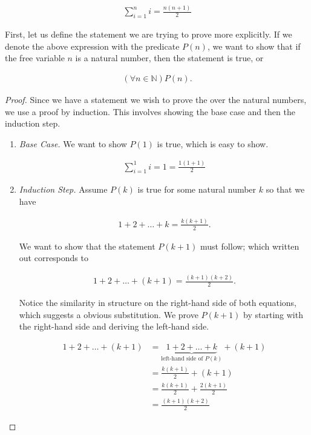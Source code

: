 \documentclass[twoside]{report}
\begin{document}
\begin{align*}
	\sum_{i = 1}^{n} i = \frac{n(n + 1)}{2}
\end{align*}

First, let us define the statement we are trying to prove more explicitly. If we denote the above expression with the predicate $P(n)$, we want to show that if the free variable $n$ is a natural number, then the statement is true, or

\begin{align*}
	(\forall n \in \mathbb{N})P(n).
\end{align*}

\vspace{\baselineskip}
\begin{proof}
	Since we have a statement we wish to prove the over the natural numbers, we use a proof by induction. This involves showing the base case and then the induction step.
	
	\vspace{\baselineskip}
	\begin{enumerate}
		\item \emph{Base Case.} We want to show $P(1)$ is true, which is easy to show.
		
		\begin{align*}
			\sum_{i = 1}^1 i = 1 = \frac{1 (1 + 1)}{2}
		\end{align*}
		
		\item \emph{Induction Step.} Assume $P(k)$ is true for some natural number $k$ so that we have
		
		\begin{align*}
			1 + 2 + \dots + k = \frac{k(k + 1)}{2}.
		\end{align*}
		
		We want to show that the statement $P(k + 1)$ must follow; which written out corresponds to
		
		\begin{align*}
			1 + 2 + \dots + (k + 1) = \frac{(k + 1)(k + 2)}{2}.
		\end{align*}
		
		Notice the similarity in structure on the right-hand side of both equations, which suggests a obvious substitution. We prove $P(k + 1)$ by starting with the right-hand side and deriving the left-hand side.
		
		\begin{align*}
			1 + 2 + \dots + (k + 1) &= \underbrace{1 + 2 + \dots + k}_\text{left-hand side of $P(k)$} + (k + 1) \\
			&= \frac{k (k + 1)}{2} + (k + 1) \\
			&= \frac{k (k + 1)}{2} + \frac{2 (k + 1)}{2} \\
			&= \frac{(k + 1)(k + 2)}{2}
		\end{align*}
		

\end{enumerate}
\end{proof}
\end{document}
